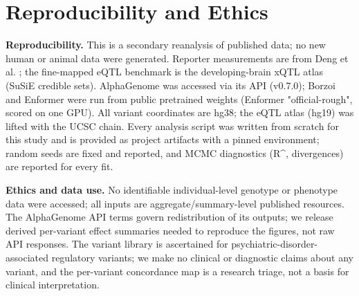 \documentclass[9pt,twocolumn]{article}
\begin{document}
\section{Reproducibility and Ethics}

\textbf{Reproducibility.} This is a secondary reanalysis of published data; no new human or animal data were generated. Reporter measurements are from Deng et al. \cite{r1}; the fine-mapped eQTL benchmark is the developing-brain xQTL atlas \cite{r14} (SuSiE credible sets). AlphaGenome was accessed via its API (v0.7.0); Borzoi and Enformer were run from public pretrained weights (Enformer "official-rough", scored on one GPU). All variant coordinates are hg38; the eQTL atlas (hg19) was lifted with the UCSC chain. Every analysis script was written from scratch for this study and is provided as project artifacts with a pinned environment; random seeds are fixed and reported, and MCMC diagnostics (R\textasciicircum{}, divergences) are reported for every fit.

\textbf{Ethics and data use.} No identifiable individual-level genotype or phenotype data were accessed; all inputs are aggregate/summary-level published resources. The AlphaGenome API terms govern redistribution of its outputs; we release derived per-variant effect summaries needed to reproduce the figures, not raw API responses. The variant library is ascertained for psychiatric-disorder-associated regulatory variants; we make no clinical or diagnostic claims about any variant, and the per-variant concordance map is a research triage, not a basis for clinical interpretation.
\end{document}
